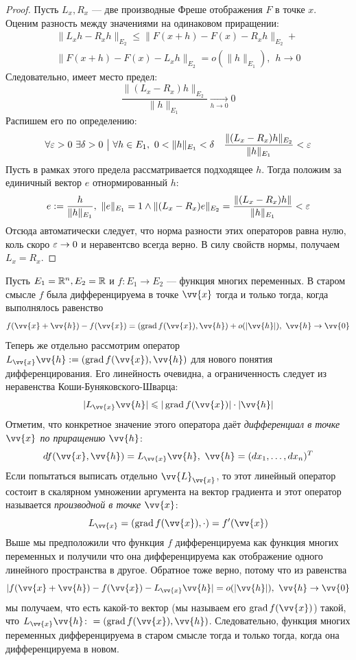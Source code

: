 \begin{proof}
    Пусть $L_x, R_x$ --- две производные Фреше отображения $F$ в точке $x$. Оценим разность между значениями на одинаковом приращении:
    \begin{multline*}
        \|L_xh - R_xh\|_{E_2} \leq \|F(x + h) - F(x) - R_xh\|_{E_2} +
        \\
        \|F(x + h) - F(x) - L_xh\|_{E_2} = o(\|h\|_{E_1}),\ \ h \to 0
    \end{multline*}
    Следовательно, имеет место предел:
    \[
        \frac{\|(L_x - R_x)h\|_{E_2}}{\|h\|_{E_1}} \xrightarrow[h \to 0]{} 0
    \]
    Распишем его по определению:
    \[
        \forall \varepsilon > 0\ \exists \delta > 0 \ \big|\  \forall h \in E_1,\ 0 < \|h\|_{E_1} < \delta \quad \frac{\|(L_x - R_x)h\|_{E_2}}{\|h\|_{E_1}} < \varepsilon
    \]
    Пусть в рамках этого предела рассматривается подходящее $h$. Тогда положим за единичный вектор $e$ отнормированный $h$:
    \[
    	e := \frac{h}{\|h\|_{E_1}},\ \|e\|_{E_1} = 1 \wedge \|(L_x - R_x)e\|_{E_2} = \frac{\|(L_x - R_x)h\|}{\|h\|_{E_1}} < \varepsilon
    \]
    Отсюда автоматически следует, что норма разности этих операторов равна нулю, коль скоро $\varepsilon \to 0$ и неравентсво всегда верно. В силу свойств нормы, получаем $L_x = R_x$.
\end{proof}

\begin{example}
    Пусть $E_1 = \mathbb{R}^n, E_2 = \mathbb{R}$ и $f \colon E_1 \to E_2$ --- функция многих переменных. В старом смысле $f$ была дифференцируема в точке $\vv{x}$ тогда и только тогда, когда выполнялось равенство
    \[
    	f(\vv{x} + \vv{h}) - f(\vv{x}) = (\grad f(\vv{x}), \vv{h}) + o(|\vv{h}|),\ \vv{h} \to \vv{0}
    \]
    Теперь же отдельно рассмотрим оператор $L_{\vv{x}}\vv{h} := (\grad f(\vv{x}), \vv{h})$ для нового понятия дифференцирования. Его линейность очевидна, а ограниченность следует из неравенства Коши-Буняковского-Шварца:
    \[
    	|L_{\vv{x}}\vv{h}| \le |\grad f(\vv{x})| \cdot |\vv{h}|
    \]
    Отметим, что конкретное значение этого оператора даёт \textit{дифференциал в точке $\vv{x}$ по приращению $\vv{h}$}:
    \[
    	df(\vv{x}, \vv{h}) = L_{\vv{x}}\vv{h},\ \vv{h} = (dx_1, \ldots, dx_n)^T
    \]
    Если попытаться выписать отдельно $\vv{L}_{\vv{x}}$, то этот линейный оператор состоит в скалярном умножении аргумента на вектор градиента и этот оператор называется \textit{производной в точке $\vv{x}$}:
    \[
         L_{\vv{x}} = (\grad f(\vv{x}), \cdot) = f'(\vv{x})
    \]
    Выше мы предположили что функция $f$ дифференцируема как функция многих переменных и получили что она дифференцируема как отображение одного линейного пространства в другое. Обратное тоже верно, потому что из равенства
    \[
        |f(\vv{x} + \vv{h}) - f(\vv{x}) - L_{\vv{x}}\vv{h}|  = o(|\vv{h}|),\ \vv{h} \to \vv{0}
    \]
     мы получаем, что есть какой-то вектор (мы называем его $\grad f(\vv{x})$) такой, что $L_{\vv{x}} \vv{h} \colon = (\grad f(\vv{x}), \vv{h})$.
     Следовательно, функция многих переменных дифференцируема в старом смысле тогда и только тогда, когда она дифференцируема в новом.
\end{example}

